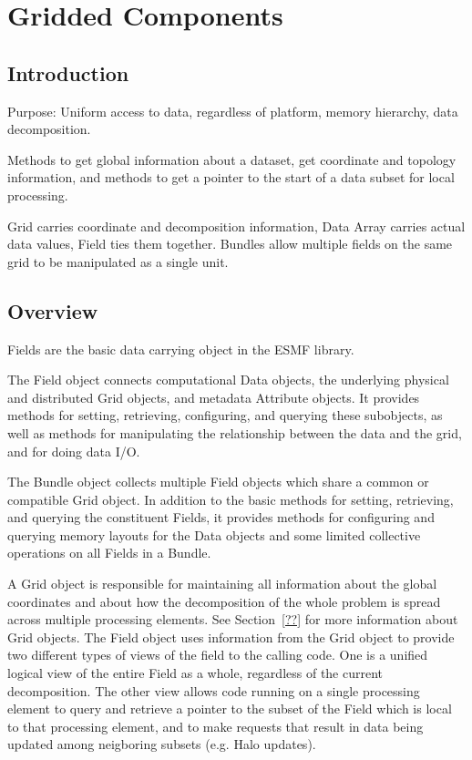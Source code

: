 \section{Gridded Components}

\subsection{Introduction}

Purpose: Uniform access to data, regardless of platform, memory
hierarchy, data decomposition.

Methods to get global information about a dataset, get coordinate
and topology information, and methods
to get a pointer to the start of a data subset for local processing. 

Grid carries coordinate and decomposition information, Data Array carries actual
data values, Field ties them together.  Bundles allow multiple
fields on the same grid to be manipulated as a single unit.

\subsection{Overview}

Fields are the basic data carrying object in the ESMF library.

The Field object connects computational Data objects, the underlying
physical and distributed Grid objects, and metadata Attribute objects.  
It provides methods
for setting, retrieving, configuring, and querying these subobjects,
as well as methods for manipulating the relationship between the
data and the grid, and for doing data I/O. 

The Bundle object collects multiple Field objects which share a
common or compatible Grid object.  In addition to the basic methods for
setting, retrieving, and querying the constituent Fields, it provides
methods for configuring and querying memory layouts for the Data objects
and some limited collective operations on all Fields in a Bundle.

A Grid object is responsible for
maintaining all information about the global coordinates and about how
the decomposition of the whole problem is spread across multiple
processing elements.  
See Section~\ref{??} for more information about Grid objects.  
The Field object uses information from the Grid object to provide
two different types of views of the field to the calling code.
One is a unified logical view of the entire Field as a whole,
regardless of the current decomposition.  The other view allows code
running on a single processing element to query and retrieve a pointer 
to the subset of the Field which is local to that processing element,
and to make requests that result in data being updated among neigboring
subsets (e.g. Halo updates).

